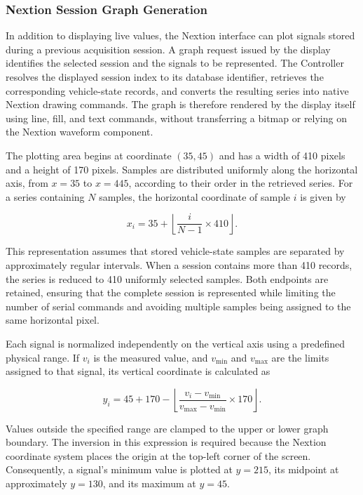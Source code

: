 \subsubsection{Nextion Session Graph Generation}

In addition to displaying live values, the Nextion interface can plot signals stored during a previous acquisition session. A graph request issued by the display identifies the selected session and the signals to be represented. The Controller resolves the displayed session index to its database identifier, retrieves the corresponding vehicle-state records, and converts the resulting series into native Nextion drawing commands. The graph is therefore rendered by the display itself using line, fill, and text commands, without transferring a bitmap or relying on the Nextion waveform component.

The plotting area begins at coordinate $(35,45)$ and has a width of 410 pixels and a height of 170 pixels. Samples are distributed uniformly along the horizontal axis, from $x=35$ to $x=445$, according to their order in the retrieved series. For a series containing $N$ samples, the horizontal coordinate of sample $i$ is given by

\begin{equation}
x_i = 35 + \left\lfloor \frac{i}{N-1} \times 410 \right\rfloor .
\end{equation}

This representation assumes that stored vehicle-state samples are separated by approximately regular intervals. When a session contains more than 410 records, the series is reduced to 410 uniformly selected samples. Both endpoints are retained, ensuring that the complete session is represented while limiting the number of serial commands and avoiding multiple samples being assigned to the same horizontal pixel.

Each signal is normalized independently on the vertical axis using a predefined physical range. If $v_i$ is the measured value, and $v_{\min}$ and $v_{\max}$ are the limits assigned to that signal, its vertical coordinate is calculated as

\begin{equation}
y_i = 45 + 170 - \left\lfloor
\frac{v_i-v_{\min}}{v_{\max}-v_{\min}} \times 170
\right\rfloor .
\end{equation}

Values outside the specified range are clamped to the upper or lower graph boundary. The inversion in this expression is required because the Nextion coordinate system places the origin at the top-left corner of the screen. Consequently, a signal's minimum value is plotted at $y=215$, its midpoint at approximately $y=130$, and its maximum at $y=45$.

